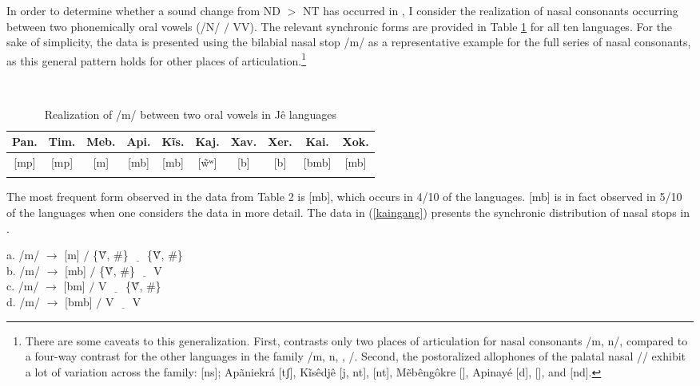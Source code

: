 \documentclass[output=paper,hidelinks]{langscibook}
\begin{document}
In order to determine whether a sound change from ND $>$ NT has occurred in , I consider the realization of nasal consonants occurring between two phonemically oral vowels (/N/ $/$ V\longrule V). The relevant synchronic forms are provided in Table \ref{Realization} for all ten  languages. For the sake of simplicity, the data is presented using the bilabial nasal stop /m/ as a representative example for the full series of nasal consonants, as this general pattern holds for other places of articulation.\footnote{There are some caveats to this generalization. First,  contrasts only two places of articulation for nasal consonants /m, n/, compared to a four-way contrast for the other languages in the family /m, n, \textltailn, {\NG}/. Second, the postoralized allophones of the palatal nasal /\textltailn/ exhibit a lot of variation across the family:  [ns];  Ap\~aniekr\'a [\textltailn tʃ], K\~is\^edj\^e [\textltailn j, nt],  [nt], M\~eb\^eng\^okre [\textltailn], Apinay\'e [\textltailn d\textyogh],  [\textbardotlessj\textltailn\textbardotlessj], and  [nd\textyogh].}


\begin{table}
\caption{Realization of /m/ between two oral vowels in Jê languages}~
\label{Realization}
\begin{tabular}{cccccccccc}
\lsptoprule
{Pan.} & {Tim.} & {Meb.} & {Api.} & {K\~is.} & {Kaj.} & {Xav.} & {Xer.} & {Kai.} & {Xok.} \\
\midrule
{[}mp{]}      & {[}mp{]}      & {[}m{]}       & {[}mb{]}      & {[}mb{]}      & {[}\~wʷ{]}  & {[}b{]}       & {[}b{]}       & {[}bmb{]}     & {[}mb{]}      \\
\lspbottomrule
\end{tabular}
\end{table}

The most frequent form observed in the data from Table 2 is [mb], which occurs in 4/10 of the  languages. [mb] is in fact observed in 5/10 of the languages when one considers the  data in more detail. The data in (\ref{kaingang}) presents the synchronic distribution of nasal stops in  \citep{Wiesemann1972}.

\begin{multicols}{2}
\ea\label{kaingang} a. /m/ $\rightarrow$ [m] $/$ \{\~V, \#\} $\underline{\hspace{1em}}$ \{\~V, \#\} \\
		b. /m/ $\rightarrow$ [mb] $/$ \{\~V, \#\} $\underline{\hspace{1em}}$ V\\
		c. /m/ $\rightarrow$ [bm] $/$ V $\underline{\hspace{1em}}$ \{\~V, \#\}\\
		d. /m/ $\rightarrow$ [bmb] $/$ V $\underline{\hspace{1em}}$ V
		\z
\end{multicols}
\end{document}
